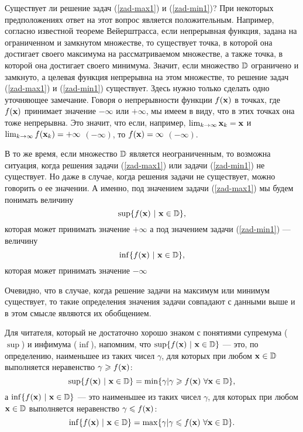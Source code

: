 Существует ли решение задач (\ref{zad-max1}) и (\ref{zad-min1})?
    При некоторых
    предположениях ответ на этот вопрос является положительным.
    Например, согласно известной теореме Вейерштрасса, если непрерывная
    функция, задана на ограниченном и замкнутом множестве, то
    существует точка, в которой она
    достигает своего максимума на рассматриваемом множестве,
    а также точка, в которой она достигает своего минимума.
     Значит, если множество $\mathbb{D}$ ограничено и замкнуто,
    а целевая функция непрерывна на этом множестве, то решение
    задач (\ref{zad-max1}) и (\ref{zad-min1}) существует.
    Здесь нужно только сделать одно уточняющее замечание. Говоря о
    непрерывности функции $f(\mathbf{x})$ в точках, где $f(\mathbf{x})$
    принимает значение $-\infty$ или $+\infty$, мы имеем в виду, что в этих точках
    она тоже непрерывна. Это значит, что если, например,
    $\lim_{k\rightarrow\infty}\mathbf{x}_{k}=\mathbf{x}$ и
    $\lim_{k\rightarrow\infty}f(\mathbf{x}_{k})=+\infty$ $(-\infty)$,
    то $f(\mathbf{x})=\infty$ $(-\infty)$.

    В то же время, если множество $\mathbb{D}$ является неограниченным,
    то возможна ситуация, когда решения задачи (\ref{zad-max1}) или
    задачи (\ref{zad-min1}) не существует. Но даже в случае, когда
    решения задачи не существует,
    можно говорить о ее значении. А именно, под значением задачи
    (\ref{zad-max1}) мы будем понимать величину
\[\sup\{f(\vc{x})\ |\ \vc{x}\in\st{D}\},\]
    которая может принимать значение $+\infty$
    а под значением задачи (\ref{zad-min1}) --- величину
\[\inf\{f(\mathbf{x})\ |\ \mathbf{x}\in\mathbb{D}\},\]
    которая может принимать значение $-\infty$

Очевидно, что в случае, когда решение задачи  на максимум или
    минимум существует, то такие определения значения задачи совпадают
    с данными выше и в этом смысле являются их обобщением.

    Для читателя, который не достаточно хорошо знаком с понятиями
    супремума ($\sup$) и инфимума ($\inf$), напомним, что $\sup\{f(\mathbf{x})\ |\
    \mathbf{x}\in\mathbb{D}\}$ --- это, по определению, наименьшее из таких
    чисел $\gamma$, для которых при любом $\mathbf{x}\in\mathbb{D}$ выполняется неравенство
    $\gamma\geqslant f(\mathbf{x})$:
\[\sup\{f(\vc{x})\ |\ \vc{x}\in\st{D}\}=\min\{\gamma |
    \gamma\geqslant f(\vc{x})\ \forall \vc{x}\in\st{D}\},\]
    а $\inf\{f(\mathbf{x})\ |\ \mathbf{x}\in\mathbb{D}\}$ --- это наименьшее из таких
    чисел $\gamma$, для которых при любом $\mathbf{x}\in\mathbb{D}$ выполняется неравенство
    $\gamma\leqslant f(\mathbf{x})$:
\[\inf\{f(\vc{x})\ |\ \vc{x}\in\st{D}\}=\max\{\gamma |
    \gamma\leqslant f(\vc{x})\ \forall \vc{x}\in\st{D}\}.\]

